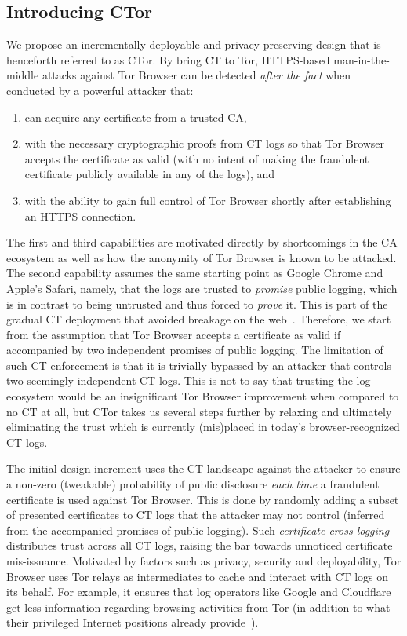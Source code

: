 \subsection{Introducing CTor}
We propose an incrementally deployable and privacy-preserving design that is
henceforth referred to as CTor.  By bring CT to Tor, HTTPS-based
man-in-the-middle attacks against Tor Browser can be detected \emph{after the
fact} when conducted by a powerful attacker that:
\begin{enumerate}
	\item can acquire any certificate from a trusted CA,
	\item with the necessary cryptographic proofs from CT logs so that
		Tor Browser accepts the certificate as valid (with no intent of making
		the fraudulent certificate publicly available in any of the logs), and
	\item with the ability to gain full control of Tor Browser shortly after
		establishing an HTTPS connection.
\end{enumerate}

The first and third capabilities are motivated directly by shortcomings in the
CA ecosystem as well as how the anonymity of Tor Browser is known to be
attacked.  The second capability assumes the same starting point as Google
Chrome and Apple's Safari, namely, that the logs are trusted to \emph{promise}
public logging, which is in contrast to being untrusted and thus forced to
\emph{prove} it.  This is part of the gradual CT deployment that avoided
breakage on the web~\cite{does-ct-break-the-web}.  Therefore, we start
from the assumption that Tor Browser accepts a certificate as valid if 
accompanied by two independent promises of public logging.  The limitation of
such CT enforcement is that it is trivially bypassed by an attacker that
controls two seemingly independent CT logs.  This is not to say that trusting
the log ecosystem would be an insignificant Tor Browser improvement when
compared to no CT at all, but CTor takes us several steps further by relaxing
and ultimately eliminating the trust which is currently (mis)placed in today's
browser-recognized CT logs.

The initial design increment uses the CT landscape against the attacker to
ensure a non-zero (tweakable) probability of public disclosure \emph{each time}
a fraudulent certificate is used against Tor Browser.  This is done by randomly
adding a subset of presented certificates to CT logs that the attacker may not
control (inferred from the accompanied promises of public logging).  Such
\emph{certificate cross-logging} distributes trust across all CT logs, raising
the bar towards unnoticed certificate mis-issuance.  Motivated by factors such
as privacy, security and deployability, Tor Browser uses Tor relays as
intermediates to cache and interact with CT logs on its behalf.  For example, it
ensures that log operators like Google and Cloudflare get less information
regarding browsing activities from Tor (in addition to what their privileged
Internet positions already provide~\cite{1mtrack,TorDNS}).

